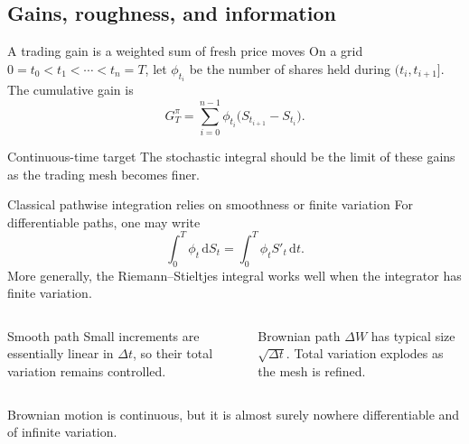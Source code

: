 \documentclass[10pt,aspectratio=169]{beamer}
\newcommand{\dd}{\,\mathrm d}
\begin{document}
\subsection{Gains, roughness, and information}

\begin{frame}{A trading gain is a weighted sum of fresh price moves}
On a grid \(0=t_0<t_1<\cdots<t_n=T\), let \(\phi_{t_i}\) be the number of shares held during \((t_i,t_{i+1}]\).
The cumulative gain is
\[
G_T^\pi=\sum_{i=0}^{n-1}\phi_{t_i}\bigl(S_{t_{i+1}}-S_{t_i}\bigr).
\]
\begin{center}
\end{center}
\begin{block}{Continuous-time target}
The stochastic integral should be the limit of these gains as the trading mesh becomes finer.
\end{block}
\end{frame}

\begin{frame}{Classical pathwise integration relies on smoothness or finite variation}
For differentiable paths, one may write
\[
\int_0^T \phi_t\dd S_t
=\int_0^T \phi_t S'_t\dd t.
\]
More generally, the Riemann--Stieltjes integral works well when the integrator has finite variation.
\begin{columns}[T,onlytextwidth]
\begin{block}{Smooth path}
Small increments are essentially linear in \(\Delta t\), so their total variation remains controlled.
\end{block}
\begin{block}{Brownian path}
\(\Delta W\) has typical size \(\sqrt{\Delta t}\). Total variation explodes as the mesh is refined.
\end{block}
\end{columns}
Brownian motion is continuous, but it is almost surely nowhere differentiable and of infinite variation.
\end{frame}
\end{document}

